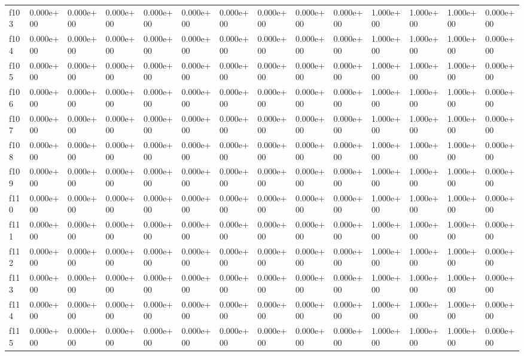 \begin{table}
\begin{tabular}{llllllllllllll}
f103 & 0.000e+00 & 0.000e+00 & 0.000e+00 & 0.000e+00 & 0.000e+00 & 0.000e+00 & 0.000e+00 & 0.000e+00 & 0.000e+00 & 1.000e+00 & 1.000e+00 & 1.000e+00 & 0.000e+00 \\
f104 & 0.000e+00 & 0.000e+00 & 0.000e+00 & 0.000e+00 & 0.000e+00 & 0.000e+00 & 0.000e+00 & 0.000e+00 & 0.000e+00 & 1.000e+00 & 1.000e+00 & 1.000e+00 & 0.000e+00 \\
f105 & 0.000e+00 & 0.000e+00 & 0.000e+00 & 0.000e+00 & 0.000e+00 & 0.000e+00 & 0.000e+00 & 0.000e+00 & 0.000e+00 & 1.000e+00 & 1.000e+00 & 1.000e+00 & 0.000e+00 \\
f106 & 0.000e+00 & 0.000e+00 & 0.000e+00 & 0.000e+00 & 0.000e+00 & 0.000e+00 & 0.000e+00 & 0.000e+00 & 0.000e+00 & 1.000e+00 & 1.000e+00 & 1.000e+00 & 0.000e+00 \\
f107 & 0.000e+00 & 0.000e+00 & 0.000e+00 & 0.000e+00 & 0.000e+00 & 0.000e+00 & 0.000e+00 & 0.000e+00 & 0.000e+00 & 1.000e+00 & 1.000e+00 & 1.000e+00 & 0.000e+00 \\
f108 & 0.000e+00 & 0.000e+00 & 0.000e+00 & 0.000e+00 & 0.000e+00 & 0.000e+00 & 0.000e+00 & 0.000e+00 & 0.000e+00 & 1.000e+00 & 1.000e+00 & 1.000e+00 & 0.000e+00 \\
f109 & 0.000e+00 & 0.000e+00 & 0.000e+00 & 0.000e+00 & 0.000e+00 & 0.000e+00 & 0.000e+00 & 0.000e+00 & 0.000e+00 & 1.000e+00 & 1.000e+00 & 1.000e+00 & 0.000e+00 \\
f110 & 0.000e+00 & 0.000e+00 & 0.000e+00 & 0.000e+00 & 0.000e+00 & 0.000e+00 & 0.000e+00 & 0.000e+00 & 0.000e+00 & 1.000e+00 & 1.000e+00 & 1.000e+00 & 0.000e+00 \\
f111 & 0.000e+00 & 0.000e+00 & 0.000e+00 & 0.000e+00 & 0.000e+00 & 0.000e+00 & 0.000e+00 & 0.000e+00 & 0.000e+00 & 1.000e+00 & 1.000e+00 & 1.000e+00 & 0.000e+00 \\
f112 & 0.000e+00 & 0.000e+00 & 0.000e+00 & 0.000e+00 & 0.000e+00 & 0.000e+00 & 0.000e+00 & 0.000e+00 & 0.000e+00 & 1.000e+00 & 1.000e+00 & 1.000e+00 & 0.000e+00 \\
f113 & 0.000e+00 & 0.000e+00 & 0.000e+00 & 0.000e+00 & 0.000e+00 & 0.000e+00 & 0.000e+00 & 0.000e+00 & 0.000e+00 & 1.000e+00 & 1.000e+00 & 1.000e+00 & 0.000e+00 \\
f114 & 0.000e+00 & 0.000e+00 & 0.000e+00 & 0.000e+00 & 0.000e+00 & 0.000e+00 & 0.000e+00 & 0.000e+00 & 0.000e+00 & 1.000e+00 & 1.000e+00 & 1.000e+00 & 0.000e+00 \\
f115 & 0.000e+00 & 0.000e+00 & 0.000e+00 & 0.000e+00 & 0.000e+00 & 0.000e+00 & 0.000e+00 & 0.000e+00 & 0.000e+00 & 1.000e+00 & 1.000e+00 & 1.000e+00 & 0.000e+00 \\

\end{tabular}
\end{table}
